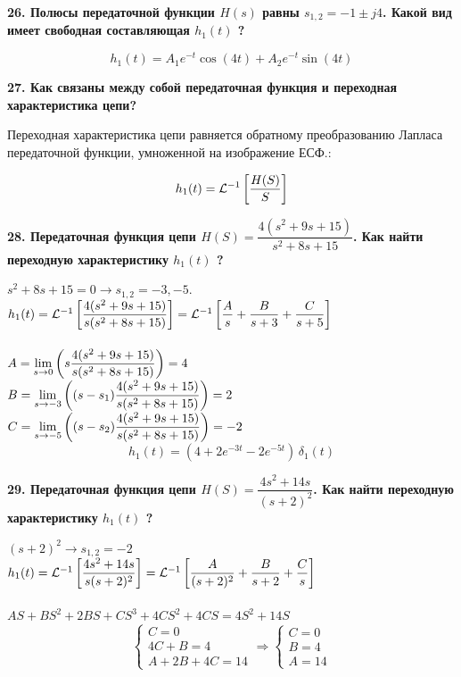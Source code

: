 \textbf{
    26. Полюсы передаточной функции 
    $ H(s) $ равны $ s_{1,2} = -1 \pm j4 $. 
    Какой вид имеет свободная составляющая 
    $ h_{1}(t) $ ?
}

$$ h_{1}(t) = A_{1}e^{-t}\cos(4t) + A_{2}e^{-t}\sin(4t) $$

\textbf{
    27. Как связаны между собой 
    передаточная функция и 
    переходная характеристика цепи? 
}

Переходная характеристика цепи равняется обратному преобразованию Лапласа передаточной функции, умноженной на изображение ЕСФ.: 

$$ h_{1}(t) = \mathcal{L}^{-1}\left[ \dfrac{H(S)}{S} \right] $$

\textbf{
    28. Передаточная функция цепи 
    $ H(S) = \dfrac{4(s^{2} + 9s + 15)}{s^{2} + 8s + 15} $. 
    Как найти переходную характеристику 
    $ h_{1}(t) $ ?
}

\newcommand{\Hs}{\dfrac{4(s^{2} + 9s + 15)}{s(s^{2} + 8s + 15)}}

$ s^{2} + 8s + 15 = 0 \rightarrow s_{1,2} = -3, -5 $.\\

$ h_{1}(t) = \lag{\Hs} = 
\lag{\dfrac{A}{s} + \dfrac{B}{s + 3} + \dfrac{C}{s + 5}}
$\\\\

$ A = \mylim[s]{0}{s\Hs} = 4 $\\

$ B = \mylim[s]{-3}{(s-s_1)\Hs} = 2 $\\

$ C = \mylim[s]{-5}{(s-s_2)\Hs} = -2 $\\

$$ h_{1}(t) = (4 + 2e^{-3t} - 2e^{-5t}) \, \delta_{1}(t) $$

\textbf{
    29. Передаточная функция цепи 
    $ H(S) = \dfrac{4s^{2} + 14s}{(s+2)^{2}} $. 
    Как найти переходную характеристику $ h_{1}(t) $ ?
}

$ (s+2)^{2} \rightarrow s_{1,2} = -2 $\\

$ h_{1}(t) = 
\mathcal{L}^{-1}\left[ \dfrac{4s^{2} + 14s}{s(s+2)^{2}} \right] = 
\mathcal{L}^{-1}\left[ \dfrac{A}{(s+2)^{2}} + \dfrac{B}{s + 2} + \dfrac{C}{s} \right]
$\\\\

$ AS+BS^2+2BS+CS^3+4CS^2+4CS=4S^2+14S $\\

\begin{equation*}
    \begin{cases}
        C = 0\\
        4C + B = 4\\
        A + 2B + 4C = 14
    \end{cases}
    \Rightarrow
    \begin{cases}
        C = 0\\
        B = 4\\
        A = 14
    \end{cases}
\end{equation*}

